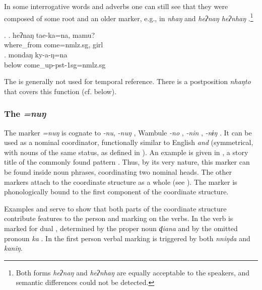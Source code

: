  
 In some interrogative words and adverbs one can still see that they were composed of some root and an older  marker, e.g.,  in \emph{nhaŋ}  and \emph{heʔnaŋ \ti heʔnhaŋ} .\footnote{Both forms  \emph{heʔnaŋ} and \emph{heʔnhaŋ} are equally acceptable to the speakers, and semantic differences could not be detected.} 

\ex. \ag. heʔnaŋ tae-ka=na, mamu?\\
		where\_from come{=nmlz.sg}, girl\\
	\bg. mondaŋ ky-a-ŋ=na \\
		below{\sc [abl]} come\_up{\sc -pst-1sg=nmlz.sg}\\
		
The  is generally not used for temporal reference. There is a postposition \emph{nhaŋto} that covers this function (cf.  below).
 

\subsubsection{The   \emph{=nuŋ}}\label{case-com}

The  marker  \emph{=nuŋ} is cognate to  \emph{-nu},   \emph{-nuŋ} \citep[81]{Ebert1994The-structure}, Wambule \emph{-no} \citep[157]{Opgenort2004A-Grammar},  \emph{-nin} \citep[91]{Doornenbal2009A-grammar},  \emph{-nɨŋ} \citep[80]{Schikowski2012_Morphology}. It can be used as a nominal coordinator, functionally similar to English \emph{and}  (symmetrical, with nouns of the same status, as defined in  \citealt[3]{Haspelmath2004_overview}). An example is given in \Next[a], a story title of the commonly found pattern . Thus, by its very nature, this  marker can be found inside noun phrases, coordinating two nominal heads. The other  markers attach to the coordinate structure as a whole (see \Next[b]). The marker is phonologically bound to the first component of the coordinate structure.

Examples \Next[c] and \Next[d] serve to show that both parts of the  coordinate structure contribute features to the person and  marking on the verbs. In \Next[c] the verb is marked for dual , determined by the proper noun \emph{ɖiana} and by the omitted pronoun \emph{ka} . In \Next[d] the first person  verbal marking is triggered by both \emph{nniŋda} and \emph{kaniŋ}.

